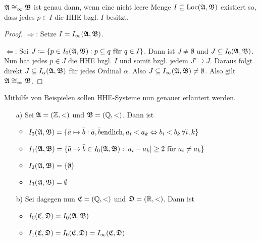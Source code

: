 \begin{lemma}
	$\mathfrak{A}\cong_\infty\mathfrak{B}$ ist genau dann, wenn eine nicht leere Menge $I\subseteq \operatorname{Loc}(\mathfrak{A},\mathfrak{B})$ existiert so, dass jedes $p\in I$ die HHE bzgl. $I$ besitzt.
\end{lemma}
\begin{proof}
	$\Rightarrow$: Setze $I=I_\infty(\mathfrak{A},\mathfrak{B})$.
	
	$\Leftarrow$: Sei $J\coloneqq\{p\in I_0(\mathfrak{A},\mathfrak{B}) : p\subseteq q \text{ für } q\in I\}$. Dann ist $J\neq\emptyset$ und $J\subseteq I_0(\mathfrak{A},\mathfrak{B})$. Nun hat jedes $p\in J$ die HHE bzgl. $I$ und somit bzgl. jedem $J'\supseteq J$. Daraus folgt direkt $J\subseteq I_\alpha(\mathfrak{A},\mathfrak{B})$ für jedes Ordinal $\alpha$. Also $J\subseteq I_\infty(\mathfrak{A},\mathfrak{B})\neq \emptyset$. Also gilt $\mathfrak{A}\cong_\infty\mathfrak{B}$.
\end{proof}

Mithilfe von Beispielen sollen HHE-Systeme nun genauer erläutert werden.
\begin{example}
\begin{itemize}
	\item[a)] Sei $\mathfrak{A}=(\mathbb{Z}, <)$ und $\mathfrak{B}=(\mathbb{Q},<)$. Dann ist
	\begin{itemize}
		\item $I_0(\mathfrak{A},\mathfrak{B})=\{\bar{a}\mapsto \bar{b} : \bar{a},\bar{b} \text{endlich}, a_i<a_k \Leftrightarrow b_i<b_k \, \forall i,k\}$
		\item $I_1(\mathfrak{A},\mathfrak{B})=\{\bar{a}\mapsto\bar{b} \in I_0(\mathfrak{A},\mathfrak{B}) : \vert a_i-a_k\vert \geq 2 \text{ für } a_i\neq a_k\}$
		\item $I_2(\mathfrak{A},\mathfrak{B})=\{\emptyset\}$
		\item $I_3(\mathfrak{A},\mathfrak{B})=\emptyset$
	\end{itemize}
	
	\item[b)] Sei dagegen nun $\mathfrak{C}=(\mathbb{Q},<)$ und $\mathfrak{D}=(\mathbb{R},<)$. Dann ist
	\begin{itemize}
		\item $I_0(\mathfrak{C},\mathfrak{D})=I_0(\mathfrak{A},\mathfrak{B})$
		\item $I_1(\mathfrak{C},\mathfrak{D})=I_0(\mathfrak{C},\mathfrak{D})=I_\infty(\mathfrak{C},\mathfrak{D})$
	\end{itemize}
\end{itemize}
\end{example}

